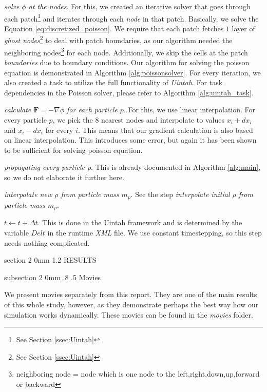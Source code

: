 \documentclass[notitlepage, 12pt]{article}
\makeatletter
\renewcommand{\section}{\@startsection       %
        {section}
        {2}
        {0mm}
        {1.2\baselineskip}
        {\baselineskip}
        {\centering\normalsize}}
\renewcommand{\subsection}{\@startsection    %
        {subsection}
        {2}
        {0mm}
        {.8\baselineskip}
        {.5\baselineskip}
        {\bfseries\normalsize}}
\makeatother
\begin{document}
\emph{solve $\phi$ at the nodes}. For this, we created an iterative solver 
that goes through each patch\footnote{See Section \ref{ssec:Uintah}} and 
iterates through each \emph{node} in that patch. Basically, we solve 
the Equation \ref{eq:discretized_poisson}. We require that each patch 
fetches $1$ layer of \emph{ghost nodes}\footnote{See Section \ref{ssec:Uintah}} 
to deal with patch boundaries, as our algorithm needed the neighboring nodes\footnote{neighboring node = node which is one node to the left,right,down,up,forward or backward} 
for each node. Additionally, we skip the cells at the patch \emph{boundaries} due 
to boundary conditions. Our algorithm for solving the poisson 
equation is demonstrated in Algorithm \ref{alg:poissonsolver}. For every iteration, we also 
created a task to utilize the full functionality of \emph{Uintah}. For task dependencies in the Poisson solver, please refer to Algorithm 
\ref{alg:uintah_task}.

\emph{calculate $\mathbf{F}=-\nabla \phi$ for each particle $p$}. For this, 
we use linear interpolation. For every particle $p$, we pick the $8$ nearest 
nodes and interpolate to values $x_i+dx_i$ and $x_i-dx_i$ for every $i$. 
This means that our gradient calculation is also based on linear interpolation. 
This introduces some error, but again it has been shown to be sufficient 
for solving poisson equation\citep{linearinterpolation}.

\emph{propagating every particle p}. This is already documented in 
Algorithm \ref{alg:main}, so we do not elaborate it further here.

\emph{interpolate new $\rho$ from particle mass $m_p$}. See the step 
\emph{interpolate initial $\rho$ from particle mass $m_p$}.

\emph{$t \gets t + \Delta t$}. This is done in the Uintah framework 
and is determined by the variable $Delt$ in the runtime \emph{XML} file. 
We use constant timestepping, so this step needs nothing complicated.


\section{RESULTS}

\subsection{Movies}

We present movies separately from this report. They are one of the main results of this whole study, however, as they demonstrate 
perhaps the best way how our simulation works dynamically. These movies can be found in the \emph{movies} folder.
\end{document}
